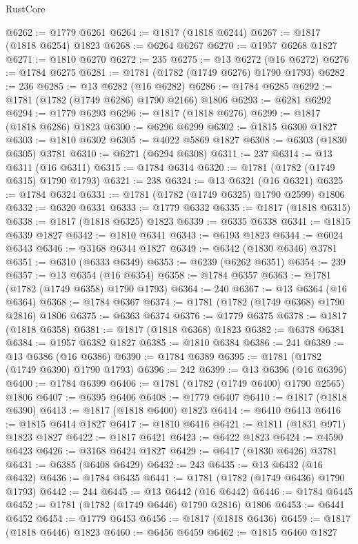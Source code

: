\begin{lexlean}{RustCore}
\begin{coremodule}
@6262 := @1779 @6261
@6264 := @1817 (@1818 @6244)
@6267 := @1817 (@1818 @6254) @1823
@6268 := @6264 @6267
@6270 := @1957 @6268 @1827
@6271 := @1810 @6270
@6272 := 235
@6275 := @13 @6272 (@16 @6272)
@6276 := @1784 @6275
@6281 := @1781 (@1782 (@1749 @6276) @1790 @1793)
@6282 := 236
@6285 := @13 @6282 (@16 @6282)
@6286 := @1784 @6285
@6292 := @1781 (@1782 (@1749 @6286) @1790 @2166) @1806
@6293 := @6281 @6292
@6294 := @1779 @6293
@6296 := @1817 (@1818 @6276)
@6299 := @1817 (@1818 @6286) @1823
@6300 := @6296 @6299
@6302 := @1815 @6300 @1827
@6303 := @1810 @6302
@6305 := @4022 @5869 @1827
@6308 := @6303 (@1830 @6305) @3781
@6310 := @6271 (@6294 @6308)
@6311 := 237
@6314 := @13 @6311 (@16 @6311)
@6315 := @1784 @6314
@6320 := @1781 (@1782 (@1749 @6315) @1790 @1793)
@6321 := 238
@6324 := @13 @6321 (@16 @6321)
@6325 := @1784 @6324
@6331 := @1781 (@1782 (@1749 @6325) @1790 @2599) @1806
@6332 := @6320 @6331
@6333 := @1779 @6332
@6335 := @1817 (@1818 @6315)
@6338 := @1817 (@1818 @6325) @1823
@6339 := @6335 @6338
@6341 := @1815 @6339 @1827
@6342 := @1810 @6341
@6343 := @6193 @1823
@6344 := @6024 @6343
@6346 := @3168 @6344 @1827
@6349 := @6342 (@1830 @6346) @3781
@6351 := @6310 (@6333 @6349)
@6353 := @6239 (@6262 @6351)
@6354 := 239
@6357 := @13 @6354 (@16 @6354)
@6358 := @1784 @6357
@6363 := @1781 (@1782 (@1749 @6358) @1790 @1793)
@6364 := 240
@6367 := @13 @6364 (@16 @6364)
@6368 := @1784 @6367
@6374 := @1781 (@1782 (@1749 @6368) @1790 @2816) @1806
@6375 := @6363 @6374
@6376 := @1779 @6375
@6378 := @1817 (@1818 @6358)
@6381 := @1817 (@1818 @6368) @1823
@6382 := @6378 @6381
@6384 := @1957 @6382 @1827
@6385 := @1810 @6384
@6386 := 241
@6389 := @13 @6386 (@16 @6386)
@6390 := @1784 @6389
@6395 := @1781 (@1782 (@1749 @6390) @1790 @1793)
@6396 := 242
@6399 := @13 @6396 (@16 @6396)
@6400 := @1784 @6399
@6406 := @1781 (@1782 (@1749 @6400) @1790 @2565) @1806
@6407 := @6395 @6406
@6408 := @1779 @6407
@6410 := @1817 (@1818 @6390)
@6413 := @1817 (@1818 @6400) @1823
@6414 := @6410 @6413
@6416 := @1815 @6414 @1827
@6417 := @1810 @6416
@6421 := @1811 (@1831 @971) @1823 @1827
@6422 := @1817 @6421
@6423 := @6422 @1823
@6424 := @4590 @6423
@6426 := @3168 @6424 @1827
@6429 := @6417 (@1830 @6426) @3781
@6431 := @6385 (@6408 @6429)
@6432 := 243
@6435 := @13 @6432 (@16 @6432)
@6436 := @1784 @6435
@6441 := @1781 (@1782 (@1749 @6436) @1790 @1793)
@6442 := 244
@6445 := @13 @6442 (@16 @6442)
@6446 := @1784 @6445
@6452 := @1781 (@1782 (@1749 @6446) @1790 @2816) @1806
@6453 := @6441 @6452
@6454 := @1779 @6453
@6456 := @1817 (@1818 @6436)
@6459 := @1817 (@1818 @6446) @1823
@6460 := @6456 @6459
@6462 := @1815 @6460 @1827

\end{coremodule}
\end{lexlean}
